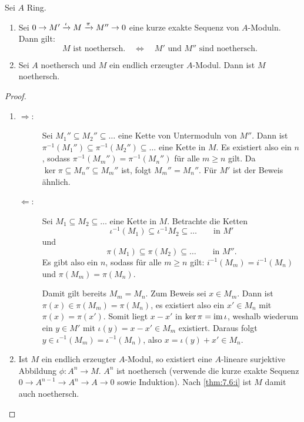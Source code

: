 \documentclass[12pt,a4paper]{scrartcl}
\theoremstyle{cplain}
\theoremstyle{cdef}
\begin{document}

\begin{satz} \label{thm:7.6}
	Sei $A$ Ring.
	\begin{enumerate}
		\item \label{thm:7.6:i} Sei $0\to M'\xrightarrow{\iota} M\xrightarrow{\pi} M''\to 0$ eine kurze exakte Sequenz von $A$-Moduln. Dann gilt:
		\[\text{$M$ ist noethersch.} \quad \Longleftrightarrow\quad \text{$M'$ und $M''$ sind noethersch.}\]
		\item Sei $A$ noethersch und $M$ ein endlich erzeugter $A$-Modul. Dann ist $M$ noethersch.\label{thm:7.6:ii}
	\end{enumerate}
\end{satz}
\begin{proof}
	\leavevmode
	\begin{enumerate}[label=\ref{thm:7.6:\roman*}]
		\item \begin{description}
			\item[\glqq$\Rightarrow$\grqq:] Sei $M_1''\subseteq M_2''\subseteq \dots$ eine Kette von Untermoduln von $M''$. Dann ist $\pi^{-1}(M_1'')\subseteq \pi^{-1}(M_2'')\subseteq \dots$ eine Kette in $M$. Es existiert also ein $n$, sodass $\pi^{-1}(M_m'') = \pi^{-1}(M_n'')$ für alle $m\ge n$ gilt. Da $\ker\pi\subseteq M_n''\subseteq M_m''$ ist, folgt $M_m'' = M_n''$. Für $M'$ ist der Beweis ähnlich.
			\item[\glqq$\Leftarrow$\grqq:] Sei $M_1\subseteq M_2\subseteq\dots$ eine Kette in $M$. Betrachte die Ketten
			\[\iota^{-1}(M_1)\subseteq \iota^{-1}M_2\subseteq\dots\qquad \text{in }M'\]
			und
			\[\pi(M_1)\subseteq \pi(M_2)\subseteq \dots \qquad \text{in }M''.\]
			Es gibt also ein $n$, sodass für alle $m\ge n$ gilt: $i^{-1}(M_m) = i^{-1}(M_n)$ und $\pi(M_m) = \pi(M_n)$.
			
			Damit gilt bereits $M_m = M_n$. Zum Beweis sei $x\in M_m$. Dann ist $\pi(x) \in \pi(M_m) = \pi(M_n)$, es existiert also ein $x'\in M_n$ mit $\pi(x) = \pi(x')$. Somit liegt $x-x'$ in $\operatorname{ker} \pi = \operatorname{im}  \iota$, weshalb wiederum ein $y \in M'$ mit $\iota(y) = x-x'\in M_m$ existiert. Daraus folgt $y\in \iota^{-1}(M_m) = \iota^{-1}(M_n)$, also $x = \iota(y) +x' \in M_n$.
		\end{description}
		\item Ist $M$ ein endlich erzeugter $A$-Modul, so existiert eine $A$-lineare surjektive Abbildung $\phi\colon A^n\to M$. $A^n$ ist noethersch (verwende die kurze exakte Sequenz $0\to A^{n-1}\to A^n\to A \to 0$ sowie Induktion). Nach \ref{thm:7.6:i} ist $M$ damit auch noethersch.
		\qedhere
	\end{enumerate}
\end{proof}
\end{document}
